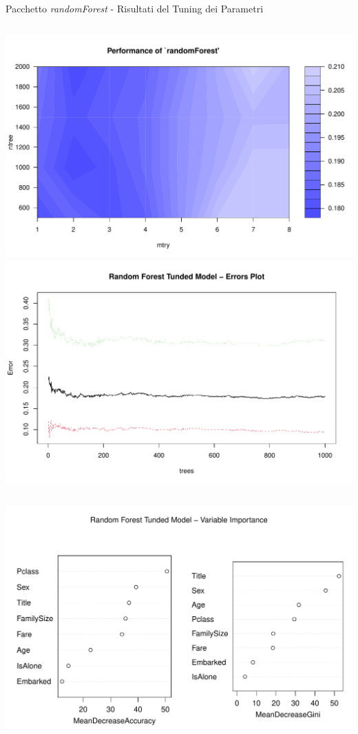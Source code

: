 \documentclass[9pt, xcolor=table]{beamer}
\begin{document}
	\begin{frame}{Pacchetto \textit{randomForest} - Risultati del Tuning dei Parametri}
		\begin{columns}
			\centering
			\includegraphics[scale=0.26]{randomF-tuned-performance}
			\centering
			\includegraphics[scale=0.26]{randomF-tuned-errors}
		\end{columns}
		\begin{columns}
			\column{0.5\textwidth}
			\centering
			\includegraphics[scale=0.26]{randomF-tuned-var-importance}

\end{columns}
\end{frame}
\end{document}
